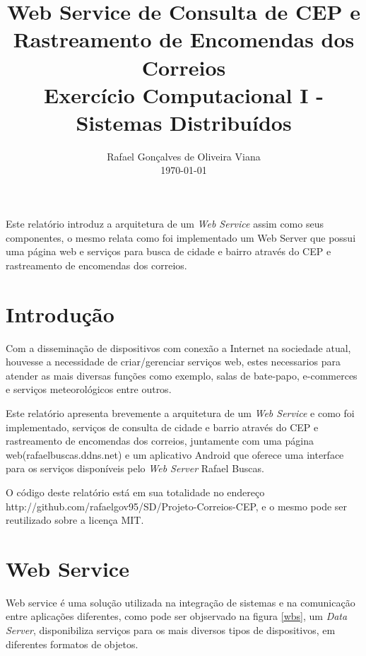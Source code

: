 \documentclass[12pt]{article}
\title{Web Service de Consulta de CEP e Rastreamento de Encomendas dos Correios  \\ Exercício Computacional I - Sistemas Distribuídos}
\author{Rafael Gonçalves de Oliveira Viana\inst{1} \\\vspace*{10pt} \normalsize  \today{} }
\begin{document}
 

\maketitle

     
\begin{resumo} 	
  Este relatório introduz a arquitetura de um \textit{Web Service} assim como seus componentes, o mesmo relata como foi implementado um Web Server que possui uma página web e serviços para busca de cidade e bairro através do CEP e rastreamento de encomendas dos correios.
\end{resumo}



\section{Introdução}
	  Com a disseminação de dispositivos com conexão a Internet na sociedade atual, houvesse a necessidade de criar/gerenciar serviços web, estes necessarios para atender as mais diversas funções como exemplo, salas de bate-papo, e-commerces e serviços meteorológicos entre outros.
  
  Este relatório apresenta brevemente a arquitetura de um \textit{Web Service} e como foi implementado, serviços de consulta de cidade e barrio através do CEP e rastreamento de encomendas dos correios, juntamente com uma página web(rafaelbuscas.ddns.net) e um aplicativo Android que oferece uma interface para os serviços disponíveis pelo \textit{Web Server} Rafael Buscas.
  
  O código deste relatório está em sua totalidade no endereço http://github.com/rafaelgov95/SD/Projeto-Correios-CEP, e o mesmo pode ser reutilizado sobre a licença MIT.
\section{Web Service}
Web service é uma solução utilizada na integração de sistemas e na comunicação entre aplicações diferentes, como pode ser objservado na figura \ref{wbs}, um \textit{Data Server}, disponibiliza serviços para os mais diversos tipos de dispositivos, em diferentes formatos de objetos.
\end{document}
